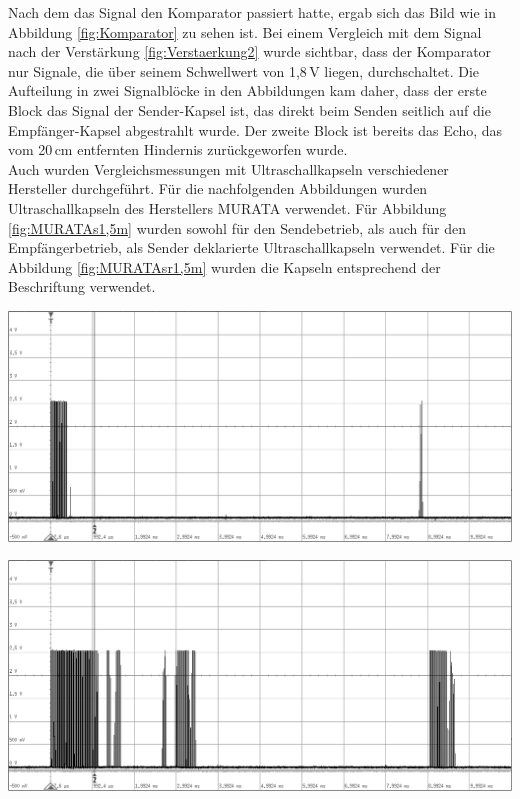Nach dem das Signal den Komparator passiert hatte, ergab sich das Bild wie in Abbildung \ref{fig:Komparator} zu sehen ist. Bei einem Vergleich mit dem Signal nach der Verstärkung \ref{fig:Verstaerkung2} wurde sichtbar, dass der Komparator nur Signale, die über seinem Schwellwert von 1,8\,V liegen, durchschaltet. Die Aufteilung in zwei Signalblöcke in den Abbildungen kam daher, dass der erste Block das Signal der Sender-Kapsel ist, das direkt beim Senden seitlich auf die Empfänger-Kapsel abgestrahlt wurde. Der zweite Block ist bereits das Echo, das vom 20\,cm entfernten Hindernis zurückgeworfen wurde.\\
Auch wurden Vergleichsmessungen mit Ultraschallkapseln verschiedener Hersteller durchgeführt. Für die nachfolgenden Abbildungen wurden  Ultraschallkapseln des Herstellers MURATA verwendet. Für Abbildung \ref{fig:MURATAs1,5m} wurden sowohl für den Sendebetrieb, als auch für den Empfängerbetrieb, als Sender deklarierte Ultraschallkapseln verwendet. Für die Abbildung \ref{fig:MURATAsr1,5m} wurden die Kapseln entsprechend der Beschriftung verwendet.\\
\begin{minipage}{0.46\textwidth}
\includegraphics[width=1\textwidth%
]{Abbildungen/MessungenP1/MURATAs1,5m.png}
\label{fig:MURATAs1,5m}
\end{minipage}\qquad
\begin{minipage}{0.46\textwidth}
\includegraphics[width=1\textwidth%
]{Abbildungen/MessungenP1/MURATAsr1,5m.png}
\label{fig:MURATAsr1,5m}
\end{minipage}\\
